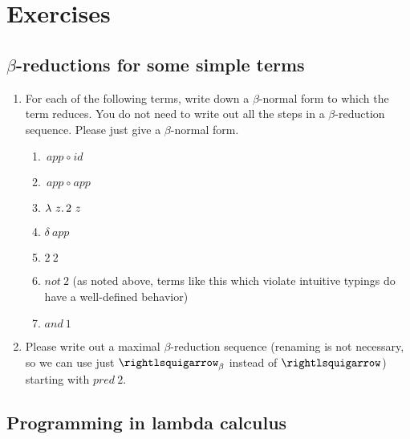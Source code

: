\section{Exercises}

\subsection{$\beta$-reductions for some simple terms}

\begin{enumerate}
\item For each of the following terms, write down a $\beta$-normal form to which the term reduces.  You do not need to write out all the steps in a $\beta$-reduction sequence.  Please just give a $\beta$-normal form.

  \begin{enumerate}
  \item $\textit{app}\ \circ\ \textit{id}$
\vspace{.5cm}
  \item $\textit{app}\ \circ\ \textit{app}$
\vspace{.5cm}
  \item $\lambda\ z.\, 2\ z$
\vspace{.5cm}
  \item $\delta\ \textit{app}$
\vspace{.5cm}
  \item $2\ 2$
\vspace{.5cm}
  \item $\textit{not}\ 2$ (as noted above, terms like this which violate intuitive typings do have a
    well-defined behavior)
\vspace{.5cm}
  \item $\textit{and}\ 1$
  \end{enumerate}

\item Please write out a maximal $\beta$-reduction sequence (renaming is not necessary, so we can use just $\betar$
  instead of $\betaa$) starting with $\textit{pred}\ 2$.

\end{enumerate}

\subsection{Programming in lambda calculus}


